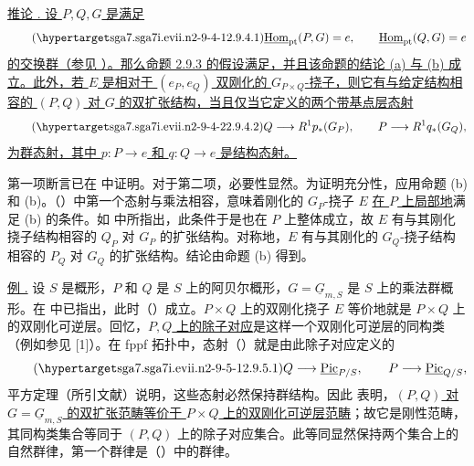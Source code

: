 \underline{推论 . 设 $P,Q,G$ 是满足}
\begin{equation}\tag{\SGARefTarget{sga7.sga7i.evii.n2-9-4-1}{2.9.4.1}}
 \underline{\operatorname{Hom}}_{\mathrm{pt}}(P,G)=e,
 \qquad
 \underline{\operatorname{Hom}}_{\mathrm{pt}}(Q,G)=e
\end{equation}
\underline{的交换群（参见 ）。那么命题 2.9.3 的假设满足，并且该命题的结论 (a) 与 (b) 成立。此外，若 $E$ 是相对于 $(e_P,e_Q)$ 双刚化的 $G_{P\times Q}$-挠子，则它有与给定结构相容的 $(P,Q)$ 对 $G$ 的双扩张结构，当且仅当它定义的两个带基点层态射}
\begin{equation}\tag{\SGARefTarget{sga7.sga7i.evii.n2-9-4-2}{2.9.4.2}}
 Q\longrightarrow R^1p_*(G_P),
 \qquad
 P\longrightarrow R^1q_*(G_Q),
\end{equation}
\underline{为群态射，其中 $p:P\longrightarrow e$ 和 $q:Q\longrightarrow e$ 是结构态射。}

第一项断言已在  中证明。对于第二项，必要性显然。为证明充分性，应用命题 (b) 和 (b)。（）中第一个态射与乘法相容，意味着刚化的 $G_P$-挠子 $E$ \underline{在 $P$ 上局部地}满足 (b) 的条件。如  中所指出，此条件于是也在 $P$ 上整体成立，故 $E$ 有与其刚化挠子结构相容的 $Q_P$ 对 $G_P$ 的扩张结构。对称地，$E$ 有与其刚化的 $G_Q$-挠子结构相容的 $P_Q$ 对 $G_Q$ 的扩张结构。结论由命题 (b) 得到。

\underline{例 .} 设 $S$ 是概形，$P$ 和 $Q$ 是 $S$ 上的阿贝尔概形，$G=\underline G_{m,S}$ 是 $S$ 上的乘法群概形。在  中已指出，此时（）成立。$P\times Q$ 上的双刚化挠子 $E$ 等价地就是 $P\times Q$ 上的双刚化可逆层。回忆，\underline{$P,Q$ 上的除子对应}是这样一个双刚化可逆层的同构类（例如参见 [1]）。在 fppf 拓扑中，态射（）就是由此除子对应定义的
\begin{equation}\tag{\SGARefTarget{sga7.sga7i.evii.n2-9-5-1}{2.9.5.1}}
 Q\longrightarrow\underline{\operatorname{Pic}}_{P/S},
 \qquad
 P\longrightarrow\underline{\operatorname{Pic}}_{Q/S},
\end{equation}
平方定理（所引文献）说明，这些态射必然保持群结构。因此  表明，\underline{$(P,Q)$ 对 $G=\underline G_{m,S}$ 的双扩张范畴等价于 $P\times Q$ 上的双刚化可逆层范畴}；故它是刚性范畴，其同构类集合等同于 $(P,Q)$ 上的除子对应集合。此等同显然保持两个集合上的自然群律，第一个群律是（）中的群律。

